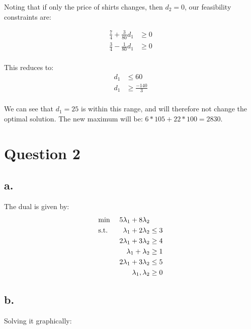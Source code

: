 \documentclass[10pt, letterpaper]{paper}
\begin{document}
Noting that if only the price of shirts changes, then $d_2 = 0$, our feasibility constraints are:

\begin{eqnarray*}
\frac{7}{4} + \frac{3}{80} d_1 &\geq 0 \\
\frac{3}{4} - \frac{1}{80} d_1 &\geq 0\\
\end{eqnarray*}

This reduces to:
\begin{eqnarray*}
d_1 &\leq 60\\
d_1 &\geq \frac{-140}{3}\\
\end{eqnarray*}

We can see that $d_1 = 25$ is within this range, and will therefore not change the optimal solution.
\newline
The new maximum will be: $6*105 + 22*100 = 2830$.

\section*{Question 2}
\subsection*{a.}
The dual is given by:
\begin{equation*}
\begin{alignedat}{3}
&\text{min \quad }&5\lambda_1 + 8\lambda_2&\\
&\text{s.t. } &\lambda_1 + 2\lambda_2  &\leq 3\\
& &2\lambda_1 + 3\lambda_2 &\geq 4\\
& &\lambda_1 + \lambda_2 &\geq 1\\
& &2\lambda_1 + 3\lambda_2 &\leq 5\\
& &\lambda_1, \lambda_2 &\geq 0
\end{alignedat}
\end{equation*}


\subsection*{b.}
Solving it graphically:
\end{document}
